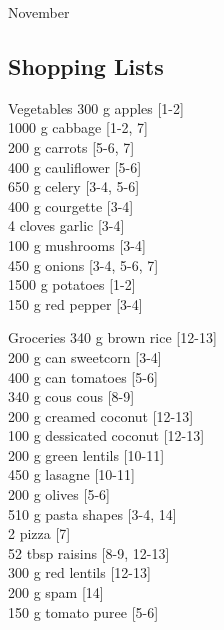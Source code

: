 \begin{menu}{November}
    \subsection*{Shopping Lists}
      \begin{shoppinglist}{Vegetables}
      300 g apples {\scriptsize[1-2]}\\
      1000 g cabbage {\scriptsize[1-2, 7]}\\
      200 g carrots {\scriptsize[5-6, 7]}\\
      400 g cauliflower {\scriptsize[5-6]}\\
      650 g celery {\scriptsize[3-4, 5-6]}\\
      400 g courgette {\scriptsize[3-4]}\\
      4 cloves garlic {\scriptsize[3-4]}\\
      100 g mushrooms {\scriptsize[3-4]}\\
      450 g onions {\scriptsize[3-4, 5-6, 7]}\\
      1500 g potatoes {\scriptsize[1-2]}\\
      150 g red pepper {\scriptsize[3-4]}\\
      \end{shoppinglist}%
      \begin{shoppinglist}{Groceries}
      340 g brown rice {\scriptsize[12-13]}\\
      200 g can sweetcorn {\scriptsize[3-4]}\\
      400 g can tomatoes {\scriptsize[5-6]}\\
      340 g cous cous {\scriptsize[8-9]}\\
      200 g creamed coconut {\scriptsize[12-13]}\\
      100 g dessicated coconut {\scriptsize[12-13]}\\
      200 g green lentils {\scriptsize[10-11]}\\
      450 g lasagne {\scriptsize[10-11]}\\
      200 g olives {\scriptsize[5-6]}\\
      510 g pasta shapes {\scriptsize[3-4, 14]}\\
      2  pizza {\scriptsize[7]}\\
      52 tbsp raisins {\scriptsize[8-9, 12-13]}\\
      300 g red lentils {\scriptsize[12-13]}\\
      200 g spam {\scriptsize[14]}\\
      150 g tomato puree {\scriptsize[5-6]}\\

\end{shoppinglist}
\end{menu}
